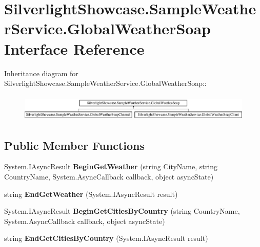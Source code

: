 \hypertarget{interface_silverlight_showcase_1_1_sample_weather_service_1_1_global_weather_soap}{
\section{SilverlightShowcase.SampleWeatherService.GlobalWeatherSoap Interface Reference}
\label{interface_silverlight_showcase_1_1_sample_weather_service_1_1_global_weather_soap}
}
Inheritance diagram for SilverlightShowcase.SampleWeatherService.GlobalWeatherSoap::\begin{figure}[H]
\begin{center}
\leavevmode
\includegraphics[height=1.2933cm]{interface_silverlight_showcase_1_1_sample_weather_service_1_1_global_weather_soap}
\end{center}
\end{figure}
\subsection*{Public Member Functions}
\begin{DoxyCompactItemize}
\item 
\hypertarget{interface_silverlight_showcase_1_1_sample_weather_service_1_1_global_weather_soap_a3d3050e63b23022e372fe1526a4a86ec}{
System.IAsyncResult {\bfseries BeginGetWeather} (string CityName, string CountryName, System.AsyncCallback callback, object asyncState)}
\label{interface_silverlight_showcase_1_1_sample_weather_service_1_1_global_weather_soap_a3d3050e63b23022e372fe1526a4a86ec}

\item 
\hypertarget{interface_silverlight_showcase_1_1_sample_weather_service_1_1_global_weather_soap_ad2845115cdc03a0af09b1d3928999ef0}{
string {\bfseries EndGetWeather} (System.IAsyncResult result)}
\label{interface_silverlight_showcase_1_1_sample_weather_service_1_1_global_weather_soap_ad2845115cdc03a0af09b1d3928999ef0}

\item 
\hypertarget{interface_silverlight_showcase_1_1_sample_weather_service_1_1_global_weather_soap_a6cdd15bbfcec821f086ba7e2853c0f78}{
System.IAsyncResult {\bfseries BeginGetCitiesByCountry} (string CountryName, System.AsyncCallback callback, object asyncState)}
\label{interface_silverlight_showcase_1_1_sample_weather_service_1_1_global_weather_soap_a6cdd15bbfcec821f086ba7e2853c0f78}

\item 
\hypertarget{interface_silverlight_showcase_1_1_sample_weather_service_1_1_global_weather_soap_a1d978cebb2492990ce8f7070dabcf854}{
string {\bfseries EndGetCitiesByCountry} (System.IAsyncResult result)}
\label{interface_silverlight_showcase_1_1_sample_weather_service_1_1_global_weather_soap_a1d978cebb2492990ce8f7070dabcf854}

\end{DoxyCompactItemize}


